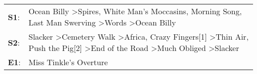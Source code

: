 \begin{supertabular}{p{0.03\textwidth}p{0.92\textwidth}}
 \textbf{S1}:  &                                                                                                                Ocean Billy\textsuperscript{} \textgreater \enspace Spires\textsuperscript{}, \enspace White Man's Moccasins\textsuperscript{}, \enspace Morning Song\textsuperscript{}, \enspace Last Man Swerving\textsuperscript{} \textgreater \enspace Words\textsuperscript{} \textgreater \enspace Ocean Billy\textsuperscript{}  \enspace  \\
 \textbf{S2}:  &  Slacker\textsuperscript{} \textgreater \enspace Cemetery Walk\textsuperscript{} \textgreater \enspace Africa\textsuperscript{}, \enspace Crazy Fingers[1]\textsuperscript{} \textgreater \enspace Thin Air\textsuperscript{}, \enspace Push the Pig[2]\textsuperscript{} \textgreater \enspace End of the Road\textsuperscript{} \textgreater \enspace Much Obliged\textsuperscript{} \textgreater \enspace Slacker\textsuperscript{}  \enspace  \\
 \textbf{E1}:  &                                                                                                                                                                                                                                                                                                                                                                                               Miss Tinkle's Overture\textsuperscript{}  \enspace  \\
\end{supertabular}
